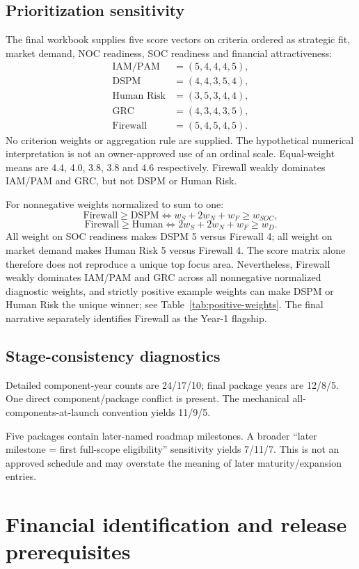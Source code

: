 \subsection{Prioritization sensitivity}\label{app:score}
The final workbook supplies five score vectors on criteria ordered as strategic fit, market demand, NOC readiness, SOC readiness and financial attractiveness:
\[
\begin{aligned}
\text{IAM/PAM}&=(5,4,4,4,5),\\
\text{DSPM}&=(4,4,3,5,4),\\
\text{Human Risk}&=(3,5,3,4,4),\\
\text{GRC}&=(4,3,4,3,5),\\
\text{Firewall}&=(5,4,5,4,5).
\end{aligned}
\]
No criterion weights or aggregation rule are supplied. The hypothetical numerical interpretation is not an owner-approved use of an ordinal scale. Equal-weight means are 4.4, 4.0, 3.8, 3.8 and 4.6 respectively. Firewall weakly dominates IAM/PAM and GRC, but not DSPM or Human Risk.

For nonnegative weights normalized to sum to one:
\[
\text{Firewall}\ge\text{DSPM}
\iff w_S+2w_N+w_F\ge w_{SOC},
\]
\[
\text{Firewall}\ge\text{Human}
\iff 2w_S+2w_N+w_F\ge w_D.
\]
All weight on SOC readiness makes DSPM 5 versus Firewall 4; all weight on market demand makes Human Risk 5 versus Firewall 4. The score matrix alone therefore does not reproduce a unique top focus area. Nevertheless, Firewall weakly dominates IAM/PAM and GRC across all nonnegative normalized diagnostic weights, and strictly positive example weights can make DSPM or Human Risk the unique winner; see Table~\ref{tab:positive-weights}. The final narrative separately identifies Firewall as the Year-1 flagship.


\subsection{Stage-consistency diagnostics}\label{app:stage}
Detailed component-year counts are 24/17/10; final package years are 12/8/5. One direct component/package conflict is present. The mechanical all-components-at-launch convention yields 11/9/5.

Five packages contain later-named roadmap milestones. A broader ``later milestone = first full-scope eligibility'' sensitivity yields 7/11/7. This is not an approved schedule and may overstate the meaning of later maturity/expansion entries.


\section{Financial identification and release prerequisites}\label{app:financial}
\setcounter{table}{0}

